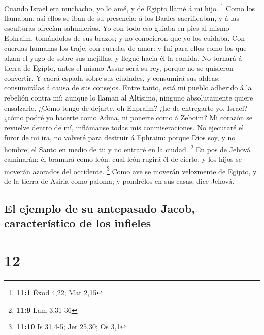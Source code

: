  Cuando Israel era muchacho, yo lo amé, y de Egipto llamé
á mi hijo. \footnote{\textbf{11:1} Éxod 4,22; Mat 2,15} 
Como los llamaban, así ellos se iban de su presencia; á los Baales
sacrificaban, y á las esculturas ofrecían sahumerios.  Yo
con todo eso guiaba en pies al mismo Ephraim, tomándolos de sus brazos;
y no conocieron que yo los cuidaba.  Con cuerdas humanas
los traje, con cuerdas de amor: y fuí para ellos como los que alzan el
yugo de sobre sus mejillas, y llegué hacia él la comida. 
No tornará á tierra de Egipto, antes el mismo Assur será su rey, porque
no se quisieron convertir.  Y caerá espada sobre sus
ciudades, y consumirá sus aldeas; consumirálas á causa de sus consejos.
 Entre tanto, está mi pueblo adherido á la rebelión contra
mí: aunque lo llaman al Altísimo, ninguno absolutamente quiere
ensalzarle.  ¿Cómo tengo de dejarte, oh Ehpraim? ¿he de
entregarte yo, Israel? ¿cómo podré yo hacerte como Adma, ni ponerte como
á Zeboim? Mi corazón se revuelve dentro de mí, inflámanse todas mis
conmiseraciones.  No ejecutaré el furor de mi ira, no
volveré para destruir á Ephraim: porque Dios soy, y no hombre; el Santo
en medio de ti: y no entraré en la ciudad. \footnote{\textbf{11:9} Lam
  3,31-36}  En pos de Jehová caminarán: él bramará como
león: cual león rugirá él de cierto, y los hijos se moverán azorados del
occidente. \footnote{\textbf{11:10} Is 31,4-5; Jer 25,30; Os 3,1}
 Como ave se moverán velozmente de Egipto, y de la tierra
de Asiria como paloma; y pondrélos en sus casas, dice Jehová.

\hypertarget{el-ejemplo-de-su-antepasado-jacob-caracteruxedstico-de-los-infieles}{%
\subsection{El ejemplo de su antepasado Jacob, característico de los
infieles}\label{el-ejemplo-de-su-antepasado-jacob-caracteruxedstico-de-los-infieles}}

\hypertarget{section-11}{%
\section{12}\label{section-11}}

